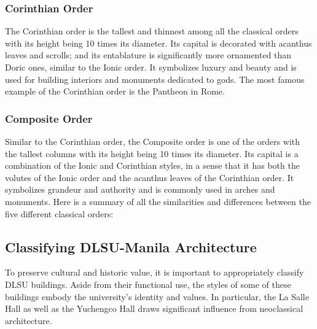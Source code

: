 \documentclass[manuscript,screen,12pt]{article}
\begin{document}
\subsubsection{Corinthian Order}

The Corinthian order is the tallest and thinnest among all the classical orders with its height being 10 times its diameter. Its capital is decorated with acanthus leaves and scrolls; and its entablature is significantly more ornamented than Doric ones, similar to the Ionic order. It symbolizes luxury and beauty and is used for building interiors and monuments dedicated to gods. The most famous example of the Corinthian order is the Pantheon in Rome.

\subsubsection{Composite Order}
Similar to the Corinthian order, the Composite order is one of the orders with the tallest columns with its height being 10 times its diameter. Its capital is a combination of the Ionic and Corinthian styles, in a sense that it has both the volutes of the Ionic order and the acanthus leaves of the Corinthian order. It symbolizes grandeur and authority and is commonly used in arches and monuments. 
Here is a summary of all the similarities and differences between the five different classical orders:

\subsection{Classifying DLSU-Manila Architecture}
To preserve cultural and historic value, it is important to appropriately classify DLSU buildings. Aside from their functional use, the styles of some of these buildings embody the university’s identity and values. In particular, the La Salle Hall as well as the Yuchengco Hall draws significant influence from neoclassical architecture.
\end{document}
